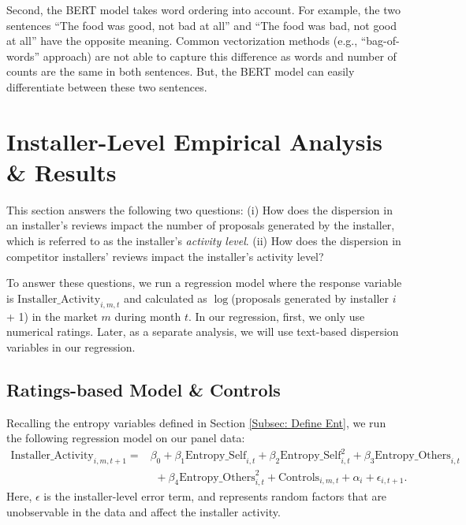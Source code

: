 \documentclass[msom,blindrev]{informs3}
\begin{document}
Second, the BERT model takes word ordering into account. For example, the two sentences ``The food was good, not bad at all'' and ``The food was bad, not good at all'' have the opposite meaning. Common vectorization methods (e.g., ``bag-of-words'' approach) are not able to capture this difference as words and number of counts are the same in both sentences. But, the BERT model can easily differentiate between these two sentences.


\section{Installer-Level Empirical Analysis \& Results}

This section answers the following two questions: (i) How does the dispersion in an installer's reviews impact the  number of proposals generated by the installer, which is referred to as the installer's \emph{activity level}. (ii) How does the dispersion in competitor installers' reviews impact the installer's activity level?

To answer these questions, we run a regression model where the response variable is $\text{Installer\_Activity}_{i,m,t}$ and calculated as $\log$(proposals generated by installer $i$ + 1) in the market $m$ during month $t$. In our regression, first, we only use numerical ratings. Later, as a separate analysis, we will use text-based dispersion variables in our regression.

\subsection{Ratings-based Model \& Controls}

Recalling the entropy variables defined in Section \ref{Subsec: Define Ent}, we run the following regression model on our panel data:
\begin{align}  \nonumber
    \text{Installer\_Activity}_{i,m,t+1} =&\beta_{0}+\beta_{1} \text{Entropy\_Self}_{i,t}+\beta_{2} \text{Entropy\_Self}_{i,t}^ {2}+\beta_{3} \text{Entropy\_Others}_{i,t} \\ \label{model_ind_3}
    &\hspace{5pt}+\beta_{4}\text{Entropy\_Others}_{i,t}^{2} + \text{Controls}_{i,m,t}+ \alpha_{i} + \epsilon_{i,t+1}.
\end{align}
 Here, $\epsilon$ is the installer-level error term, and represents random factors that are unobservable in the data and affect the installer activity.
\end{document}
